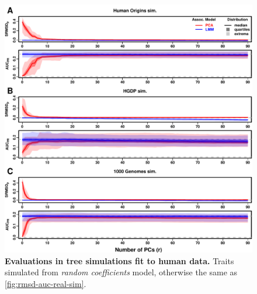 \documentclass[11pt]{article}
\begin{document}
\begin{figure}[bp!]
  \centering
  \includegraphics[width=\textwidth,height=\textheight,keepaspectratio]{rmsd-auc-real-sim.pdf}
  \caption{
    {\small 
      {\bf Evaluations in tree simulations fit to human data.}
      Traits simulated from \textit{random coefficients} model, otherwise the same as \cref{fig:rmsd-auc-real-sim}.
    }
  }
  \label{fig:rmsd-auc-real-sim-rc}
\end{figure}
\end{document}
